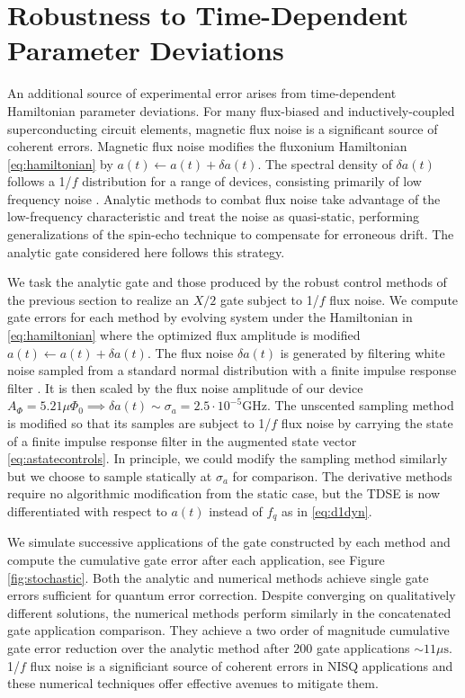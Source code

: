 \section{Robustness to Time-Dependent Parameter Deviations \label{sec:stochastic}}
An additional source of experimental error arises from time-dependent
Hamiltonian parameter deviations. For many flux-biased and inductively-coupled
superconducting circuit elements, magnetic flux noise is a significant
source of coherent errors. Magnetic flux noise
modifies the fluxonium Hamiltonian \eqref{eq:hamiltonian}
by $a(t) \gets a(t) + \delta a(t)$.
The spectral density of $\delta a(t)$ follows a
1/$f$ distribution for a range of devices, consisting primarily of low frequency
noise \cite{bialczak20071f, koch2007model,
  yoshihara2006decoherence, yoshihara2010correlated}.
Analytic methods to combat flux noise
take advantage of the low-frequency characteristic and
treat the noise as quasi-static, performing generalizations of the spin-echo technique
to compensate for erroneous drift. The analytic gate considered here
follows this strategy.

We task the analytic gate and those produced by
the robust control methods of the previous section
to realize an $X/2$ gate subject to 1/$f$ flux noise.
We compute gate errors for each method
by evolving system under the Hamiltonian in \eqref{eq:hamiltonian}
where the optimized flux amplitude is modified $a(t) \gets a(t) + \delta a(t)$.
The flux noise $\delta a(t)$ is generated by
filtering white noise sampled from a standard normal distribution with a finite
impulse response filter \cite{saspweb2011}.
It is then scaled by the 
flux noise amplitude of our device $A_{\Phi} = 5.21 \mu \Phi_{0} \implies
\delta a (t) \sim \sigma_{a} = 2.5 \cdot 10^{-5} \textrm{GHz}$.
The unscented sampling method is modified so that its samples
are subject to 1/$f$ flux noise by carrying the state of a finite impulse response filter
in the augmented state vector \eqref{eq:astatecontrols}.
In principle, we could modify the sampling method
similarly but we choose to sample statically at $\sigma_{a}$ for comparison.
The derivative methods require no algorithmic modification from the static case,
but the TDSE is now differentiated with respect to $a(t)$ instead of $f_{q}$ as
in \eqref{eq:d1dyn}.

We simulate successive applications of the gate constructed by each method
and compute the cumulative gate error
after each application, see Figure \ref{fig:stochastic}. Both the analytic
and numerical methods achieve single gate errors
sufficient for quantum error correction.
Despite converging on qualitatively different solutions, the
numerical methods perform similarly in the concatenated
gate application comparison. They achieve a two
order of magnitude cumulative gate error reduction over the analytic method after $200$
gate applications $\sim 11 \mu\textrm{s}$.
1/$f$ flux noise is a significiant source of coherent errors in NISQ applications and
these numerical techniques offer effective avenues to mitigate them.

